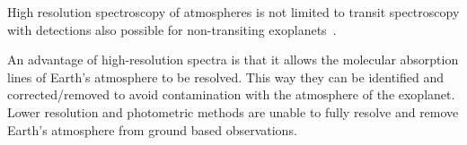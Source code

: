 High resolution spectroscopy of atmospheres is not limited to transit spectroscopy with detections also possible for non-transiting exoplanets~\citep[e.g.][]{brogi_signature_2012, brogi_carbon_2014,lockwood_nearir_2014, piskorz_evidence_2016}.

An advantage of high-resolution spectra is that it allows the molecular absorption lines of Earth's atmosphere to be resolved.
This way they can be identified and corrected/removed to avoid contamination with the atmosphere of the exoplanet.
 Lower resolution and photometric methods are unable to fully resolve and remove Earth's atmosphere from ground based observations.
